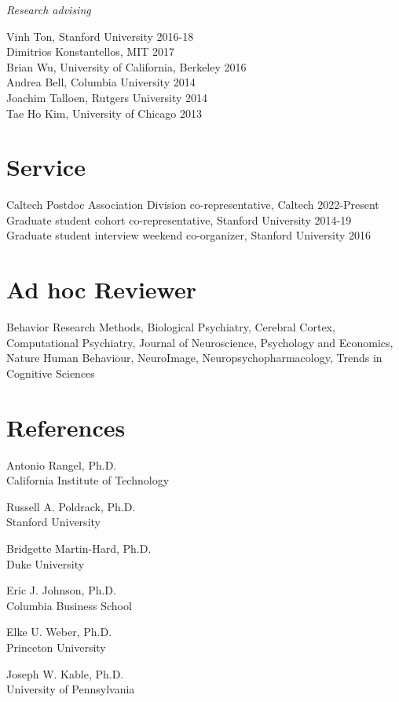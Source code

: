 \documentclass[11pt,]{article}
\begin{document}
\emph{Research advising}

Vinh Ton, Stanford University \hfill 2016-18\\
Dimitrios Konstantellos, MIT \hfill 2017\\
Brian Wu, University of California, Berkeley \hfill 2016\\
Andrea Bell, Columbia University \hfill 2014\\
Joachim Talloen, Rutgers University \hfill 2014\\
Tae Ho Kim, University of Chicago \hfill 2013

\hypertarget{service}{%
\section{Service}\label{service}}

Caltech Postdoc Association Division co-representative, Caltech
\hfill 2022-Present\\
Graduate student cohort co-representative, Stanford University
\hfill 2014-19\\
Graduate student interview weekend co-organizer, Stanford University
\hfill 2016

\hypertarget{ad-hoc-reviewer}{%
\section{Ad hoc Reviewer}\label{ad-hoc-reviewer}}

Behavior Research Methods, Biological Psychiatry, Cerebral Cortex,
Computational Psychiatry, Journal of Neuroscience, Psychology and
Economics, Nature Human Behaviour, NeuroImage, Neuropsychopharmacology,
Trends in Cognitive Sciences

\hypertarget{references}{%
\section{References}\label{references}}

Antonio Rangel, Ph.D.\\
California Institute of Technology

Russell A. Poldrack, Ph.D.\\
Stanford University

Bridgette Martin-Hard, Ph.D.\\
Duke University

Eric J. Johnson, Ph.D.\\
Columbia Business School

Elke U. Weber, Ph.D.\\
Princeton University

Joseph W. Kable, Ph.D.\\
University of Pennsylvania
\end{document}
